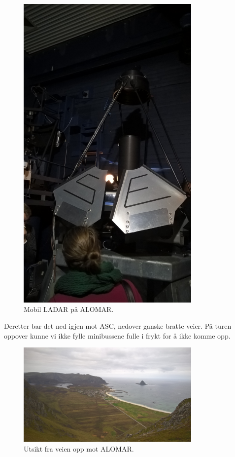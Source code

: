 \documentclass[norsk,a4paper,12pt]{article}
\begin{document}
\begin{figure}[H]
\centering
\includegraphics[width=90mm]{ladar.jpg}
\caption{Mobil LADAR p{\aa} ALOMAR. \label{overflow}}
\end{figure}

Deretter bar det ned igjen mot ASC, nedover ganske bratte veier. P{\aa} turen oppover kunne vi ikke fylle minibussene fulle i frykt for {\aa} ikke komme opp. 

\begin{figure}[H]
\centering
\includegraphics[width=90mm]{view.jpg}
\caption{Utsikt fra veien opp mot ALOMAR. \label{overflow}}
\end{figure}
\end{document}
